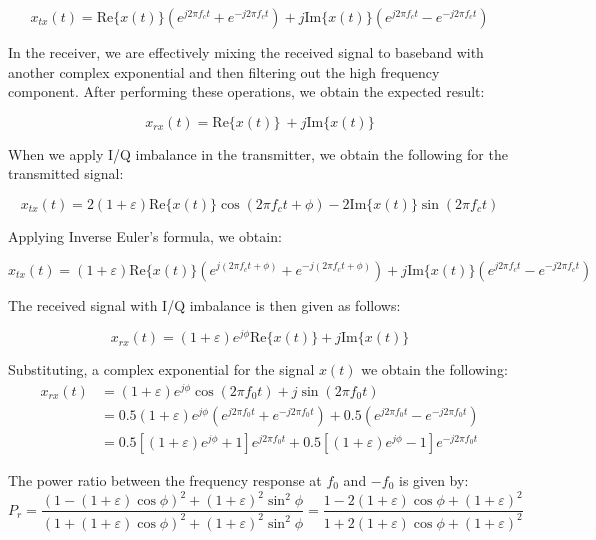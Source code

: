 \documentclass{article}
\begin{document}
\begin{equation}
	x_{tx}(t) = \text{Re}\{x(t)\}(e^{j2{\pi}f_ct} + e^{-j2{\pi}f_ct}) + j\text{Im}\{x(t)\}(e^{j2{\pi}f_ct} - e^{-j2{\pi}f_ct})
\end{equation}

In the receiver, we are effectively mixing the received signal to baseband with another complex exponential and then filtering out the high frequency component. After performing these operations, we obtain the expected result:
 
\begin{equation}
	x_{rx}(t) = \text{Re}\{x(t)\}\ + j\text{Im}\{x(t)\}
\end{equation}

When we apply I/Q imbalance in the transmitter, we obtain the following for the transmitted signal:

\begin{equation}
	x_{tx}(t) = 2(1+\varepsilon)\text{Re}\{x(t)\}\cos(2{\pi}f_ct + \phi) - 2\text{Im}\{x(t)\}\sin(2{\pi}f_ct)
\end{equation}

Applying Inverse Euler's formula, we obtain:

\begin{equation}
	x_{tx}(t) = (1+\varepsilon)\text{Re}\{x(t)\}(e^{j(2{\pi}f_ct+\phi)} + e^{-j(2{\pi}f_ct+\phi)}) + j\text{Im}\{x(t)\}(e^{j2{\pi}f_ct} - e^{-j2{\pi}f_ct})
\end{equation}

The received signal with I/Q imbalance is then given as follows:

\begin{equation}
	x_{rx}(t) = (1+\varepsilon)e^{j\phi}\text{Re}\{x(t)\} + j\text{Im}\{x(t)\}
\end{equation}

Substituting, a complex exponential for the signal $x(t)$ we obtain the following:
\begin{align}
	x_{rx}(t) &= (1+\varepsilon)e^{j\phi}\cos(2{\pi}f_0t) + j\sin(2{\pi}f_0t)  \label{eq::rx_signal_iq_imbalance} \\
	&= 0.5(1+\varepsilon)e^{j\phi}(e^{j2{\pi}f_0t} + e^{-j2{\pi}f_0t}) + 0.5(e^{j2{\pi}f_0t} - e^{-j2{\pi}f_0t})\\
	&= 0.5[(1+\varepsilon)e^{j\phi} + 1]e^{j2{\pi}f_0t} + 0.5[(1+\varepsilon)e^{j\phi} - 1]e^{-j2{\pi}f_0t}
\end{align}

The power ratio between the frequency response at $f_0$ and $-f_0$ is given by: 
\begin{equation}
	P_r = \frac{(1-(1+\varepsilon)\cos\phi)^2 + (1+\varepsilon)^2\sin^2\phi}{(1+(1+\varepsilon)\cos\phi)^2 + (1+\varepsilon)^2\sin^2\phi} = \frac{1-2(1+\varepsilon)\cos\phi+(1+\varepsilon)^2}{1+2(1+\varepsilon)\cos\phi+(1+\varepsilon)^2}
\end{equation}
\end{document}
